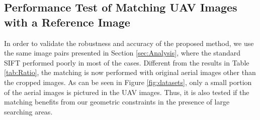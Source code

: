 
\subsection{Performance Test of Matching UAV Images with a Reference Image}
\label{ssec:matching}
In order to validate the robustness and accuracy of the proposed method, we use the same image pairs presented in Section \ref{sec:Analysis}, where the standard SIFT performed poorly in most of the cases. Different from the results in Table \ref{tab:Ratio}, the matching is now performed with original aerial images other than the cropped images. As can be seen in Figure \ref{fig:datasets}, only a small portion of the aerial images is pictured in the UAV images. %
Thus, it is also tested if the matching benefits from our geometric constraints in the presence of large searching areas.

